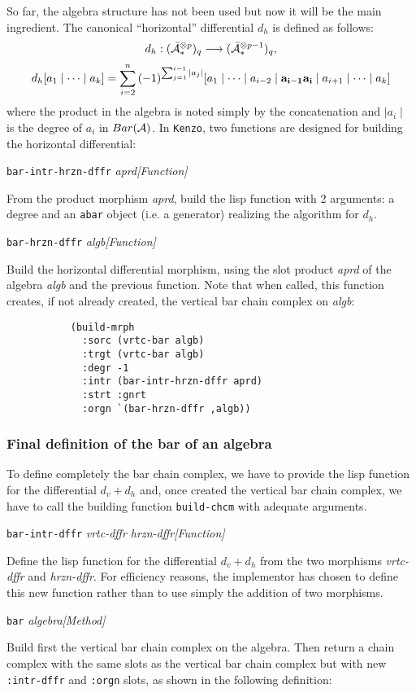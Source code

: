 So far, the algebra structure has not been used
but now it will be the main ingredient.
The canonical ``horizontal''  differential $d_h$ is defined as follows:
$$d_h:({\bar{\cal A}}_*^{\otimes p})_q \longrightarrow ({\bar{\cal A}}_*^{\otimes {p-1}})_q,$$
$$d_h [a_1 \mid \cdots \mid a_k] = \sum_{i=2}^n{(-1)^{\sum_{j=1}^{i-1}{\mid a_j \mid}}}
      [a_1 \mid \cdots \mid a_{i-2} \mid {\bf a_{i-1}a_i} \mid a_{i+1} \mid \cdots \mid a_k]$$
where the product in the algebra is noted simply by the concatenation and $\mid a_i \mid$
is the degree of $a_i$ in $Bar({\cal A})$.
In {\tt Kenzo}, two functions are designed for building the horizontal differential:
\vskip 0.45cm
{\parindent=0mm
{\leftskip=5mm
{\tt bar-intr-hrzn-dffr} {\em aprd}\hfill {\em [Function]} \par}
{\leftskip=15mm
From the product morphism {\em aprd}, build the lisp function with 2 arguments:
a degree and an {\tt abar} object (i.e. a generator) realizing the algorithm for $d_h$. \par}
{\leftskip=5mm
{\tt bar-hrzn-dffr} {\em algb}\hfill {\em [Function]} \par}
{\leftskip=15mm
Build the horizontal differential morphism, using the slot pro\-duct {\em aprd} of
the algebra {\em algb} and the previous function.
Note that when called, this function creates, if not already created,
the vertical bar chain complex on {\em algb}:
{\footnotesize\begin{verbatim}
           (build-mrph
             :sorc (vrtc-bar algb)
             :trgt (vrtc-bar algb)
             :degr -1
             :intr (bar-intr-hrzn-dffr aprd)
             :strt :gnrt
             :orgn `(bar-hrzn-dffr ,algb))
\end{verbatim}}
\par}}


\subsubsection {Final definition of the bar of an algebra}

To define completely the bar chain complex, we have to provide the lisp function
for the differential $d_v + d_h$ and, once created the vertical bar chain complex,
we have to call the building function {\tt build-chcm} with adequate arguments.
\vskip 0.45cm
{\parindent=0mm
{\leftskip=5mm
{\tt bar-intr-dffr} {\em vrtc-dffr hrzn-dffr}\hfill {\em [Function]} \par}
{\leftskip=15mm
Define the lisp function for the differential $d_v+d_h$ from the two morphisms
{\em vrtc-dffr} and {\em hrzn-dffr}. For efficiency reasons, the implementor
has chosen to define this new function rather than to use simply
the addition of two morphisms.\par}
{\leftskip=5mm
{\tt bar} {\em algebra}\hfill {\em [Method]} \par}
{\leftskip=15mm
Build first the vertical bar chain complex on the algebra. Then return a chain complex
with the same slots as the vertical bar chain complex but with new {\tt :intr-dffr}
and {\tt :orgn} slots, as shown in the following definition: \par}
}

